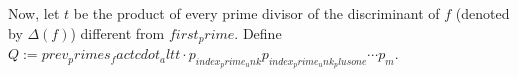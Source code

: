 Now, let $t$ be the product of every prime divisor of the discriminant of $f$ (denoted by $\Delta(f)$) different from ${first_prime}$. Define $Q:={prev_primes_fact}{cdot_alt} t\cdot p_{{index_prime_unk}}p_{{index_prime_unk_plusone}}\cdots p_m$.